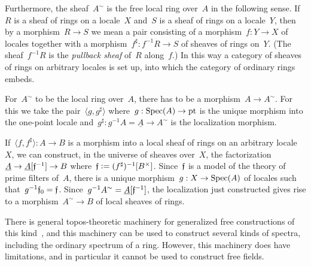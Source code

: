 \documentclass{ws-rv9x6}
\begin{document}
{Furthermore, the sheaf~$A^\sim$ is the free local ring over~$A$ in the
following sense. If~$R$ is a sheaf of rings on a locale~$X$ and~$S$ is a sheaf
of rings on a locale~$Y$, then by a morphism~$R \to S$ we mean a pair
consisting of a morphism~$f : Y \to X$ of locales together with a
morphism~$f^\sharp : f^{-1}R \to S$ of sheaves of rings on~$Y$. (The
sheaf~$f^{-1}R$ is the \emph{pullback sheaf} of~$R$ along~$f$.)
In this way a category of sheaves of rings on arbitrary locales is set up, into
which the category of ordinary rings embeds.

For~$A^\sim$ to be the local ring over~$A$, there has to be a morphism~$A \to
A^\sim$. For this we take the pair~$\langle g, g^\sharp \rangle$ where~$g :
\mathrm{Spec}(A) \to \mathrm{pt}$ is the unique morphism into the one-point locale
and~$g^\sharp : g^{-1}A = \underline{A} \to A^\sim$ is the localization
morphism.

If~$\langle f,f^\sharp \rangle : A \to B$ is a morphism into a local sheaf of
rings on an arbitrary locale~$X$, we can construct, in the universe of sheaves
over~$X$, the factorization~$\underline{A} \to
\underline{A}[\mathfrak{f}^{-1}] \to B$ where~$\mathfrak{f} \vcentcolon=
(f^\sharp)^{-1}[B^\times]$. Since~$\mathfrak{f}$ is a model of the theory of prime
filters of~$A$, there is a unique morphism~$g : X \to \mathrm{Spec}(A)$ of locales such
that~$g^{-1}\mathfrak{f}_0 = \mathfrak{f}$. Since~$g^{-1}A^\sim = \underline{A}[\mathfrak{f}^{-1}]$,
the localization just constructed gives rise to a morphism~$A^\sim \to B$ of
local sheaves of rings.

\begin{remark}There is general topos-theoretic machinery for generalized free
constructions of this kind~\cite{coste:sheaf-representation,cole:spectra}, and
this machinery can be used to construct several kinds of spectra, including the
ordinary spectrum of a ring. However, this machinery does have limitations, and
in particular it cannot be used to construct free fields.
\end{remark}

}
\end{document}
